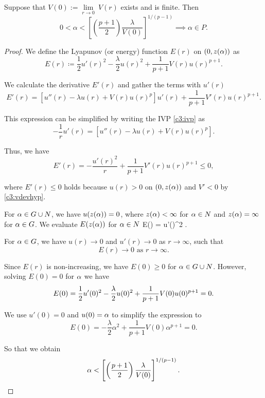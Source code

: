 \begin{lemma}\label{genlem1}%
Suppose that $V(0):=\underset{r\to0}{\lim}~V(r)$ exists and is finite. Then
\[ 0<\alpha<\left[\left(\frac{p+1}{2}\right)\frac{\lambda}{V(0)}
\right]^{1/(p-1)}\implies \alpha\in P. \]
\end{lemma}
\begin{proof}
We define the Lyapunov (or energy) function $E(r)$ on $(0,z(\alpha))$ as
\[ E(r) \coloneqq \frac{1}{2}u'(r)^2
-\frac{\lambda}{2} u(r)^2 + \frac{1}{p+1} V(r) u(r)^{p+1}. \]

We calculate the derivative $E'(r)$ and gather the terms with $u'(r)$
\[ E'(r) = \left[u''(r)-\lambda u(r)+V(r)u(r)^p\right]u'(r)
+ \frac{1}{p+1} V'(r)u(r)^{p+1}. \]

This expression can be simplified by writing the IVP \eqref{c3:ivp} as
\[ -\frac{1}{r}u'(r)=\left[u''(r)-\lambda u(r)+V(r)u(r)^p\right]. \]

Thus, we have
\[ E'(r) = -\frac{u'(r)^2}{r}
+ \frac{1}{p+1} V'(r)u(r)^{p+1} \leq 0, \]

where $E'(r)\leq 0$ holds because $u(r)>0$ on $(0,z(\alpha))$ and $V'<0$ by
\eqref{c3:vdevhyp}. 

For $\alpha\in G\cup N$, we have $u(z(\alpha))=0$, where $z(\alpha)<\infty$ for $\alpha\in N$ and
$z(\alpha)=\infty$ for $\alpha\in G$. We evaluate $E(z(\alpha))$ for $\alpha\in N$
\be \label{eza}
E(\za) = \half u'(\za)^2 . 
\ee

For $\alpha\in G$, we have $u(r)\to 0$ and $u'(r)\to 0$ as $r\to\infty$, such that
\[ E(r)\to 0\text{ as }r\to\infty. \]

Since $E(r)$ is non-increasing, we have $E(0)\geq 0$ for $\alpha\in G\cup N$.
However, solving $E(0)=0$ for $\alpha$ we have
\[ E(0) = \frac{1}{2} u'(0)^2 - \frac{\lambda}{2} u(0)^2
 + \frac{1}{p+1} V(0)u(0)^{p+1} = 0. \]

We use $u'(0)=0$ and $u(0)=\alpha$ to simplify the expression to
\[ E(0) = -\frac{\lambda}{2}\alpha^2 + 
\frac{1}{p+1} V(0)\alpha^{p+1} = 0. \]

So that we obtain 
\[
\alpha < \left[\left( \frac{p+1}{2}\right) \frac{\lambda}{V(0)} \right]^{1/(p-1)}.
\]


\end{proof}

